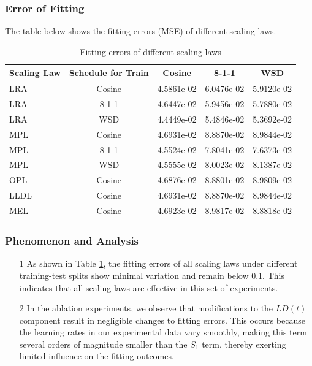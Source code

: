 \documentclass[aspectratio=169]{beamer}
\begin{document}
    \begin{frame}
        \frametitle{Error of Fitting}

        The table below shows the fitting errors (MSE) of different scaling laws.
        \begin{table}[htbp]
            \centering
            \begin{tabular}{lcccc}
                \toprule
                Scaling Law & Schedule for Train & Cosine     & 8-1-1      & WSD        \\
                \midrule
                LRA         & Cosine             & 4.5861e-02 & 6.0476e-02 & 5.9120e-02 \\
                LRA         & 8-1-1              & 4.6447e-02 & 5.9456e-02 & 5.7880e-02 \\
                LRA         & WSD                & 4.4449e-02 & 5.4846e-02 & 5.3692e-02 \\
                MPL         & Cosine             & 4.6931e-02 & 8.8870e-02 & 8.9844e-02 \\
                MPL         & 8-1-1              & 4.5524e-02 & 7.8041e-02 & 7.6373e-02 \\
                MPL         & WSD                & 4.5555e-02 & 8.0023e-02 & 8.1387e-02 \\
                OPL         & Cosine             & 4.6876e-02 & 8.8801e-02 & 8.9809e-02 \\
                LLDL        & Cosine             & 4.6931e-02 & 8.8870e-02 & 8.9844e-02 \\
                MEL         & Cosine             & 4.6923e-02 & 8.9817e-02 & 8.8818e-02 \\
                \bottomrule
            \end{tabular}
            \caption{Fitting errors of different scaling laws}
            \label{tab:fitting_error}
        \end{table}


    \end{frame}

    \begin{frame}
        \frametitle{Phenomenon and Analysis}
        \begin{enumerate}
            \item[1] As shown in Table \ref{tab:fitting_error}, the fitting errors of all scaling laws under different training-test splits show minimal variation and remain below 0.1. This indicates that all scaling laws are effective in this set of experiments.
            \item[2] In the ablation experiments, we observe that modifications to the $LD(t)$ component result in negligible changes to fitting errors.
            This occurs because the learning rates in our experimental data vary smoothly, making this term several orders of magnitude smaller than the $S_1$ term, thereby exerting limited influence on the fitting outcomes.
        \end{enumerate}
    \end{frame}
\end{document}
